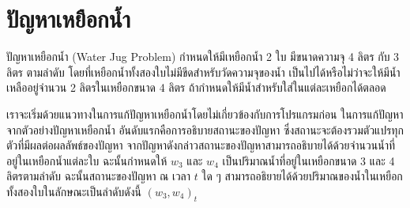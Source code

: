 \section{ปัญหาเหยือกน้ำ}
\label{sec_wjp}
%
\par{
ปัญหาเหยือกน้ำ (Water Jug Problem) 
 กำหนดให้มีเหยือกน้ำ 2 ใบ
มีขนาดความจุ 4 ลิตร กับ 3 ลิตร ตามลำดับ
โดยที่เหยือกน้ำทั้งสองใบไม่มีขีดสำหรับวัดความจุของน้ำ
เป็นไปได้หรือไม่ว่าจะให้มีน้ำเหลืออยู่จำนวน 2 ลิตรในเหยือกขนาด 4 ลิตร
ถ้ากำหนดให้มีน้ำสำหรับใส่ในแต่ละเหยือกได้ตลอด
}
%
\par{
เราจะเริ่มด้วยแนวทางในการแก้ปัญหาเหยือกน้ำโดยไม่เกี่ยวข้องกับการโปรแกรมก่อน
ในการแก้ปัญหาจากตัวอย่างปัญหาเหยือกน้ำ
อันดับแรกคือการอธิบายสถานะของปัญหา
ซึ่งสถานะจะต้องรวมตัวแปรทุกตัวที่มีผลต่อผลลัพธ์ของปัญหา
จากปัญหาดังกล่าวสถานะของปัญหาสามารถอธิบายได้ด้วยจำนวนน้ำที่อยู่ในเหยือกน้ำแต่ละใบ
ฉะนั้นกำหนดให้ $w_3$ และ $w_4$ 
เป็นปริมาณน้ำที่อยู่ในเหยือกขนาด 3 และ 4 ลิตรตามลำดับ
ฉะนั้นสถานะของปัญหา ณ เวลา $t$ ใด ๆ 
สามารถอธิยายได้ด้วยปริมาณของน้ำในเหยือกทั้งสองใบในลักษณะเป็นลำดับดังนี้ 
$(w_3, w_4)_t$
}
%
